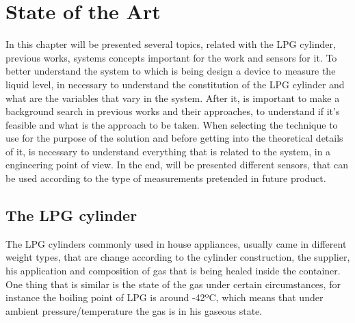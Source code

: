 \cleardoublepage
\chapter{State of the Art}\label{chap:stArt}


In this chapter will be presented several topics, related with the LPG cylinder, previous works, systems concepts important for the work and sensors for it. To better understand the system to which is being design a device to measure the liquid level, in necessary to understand the constitution of the LPG cylinder and what are the variables that vary in the system. After it, is important to make a background search in previous works and their approaches, to understand if it's feasible and what is the approach to be taken. When selecting the technique to use for the purpose of the solution and before getting into the theoretical details of it, is necessary to understand everything that is related to the system, in a engineering point of view. In the end, will be presented different sensors, that can be used according to the type of measurements pretended in future product.     
\section{The LPG cylinder}
The LPG cylinders commonly used in house appliances, usually came in different weight types, that are change according to the cylinder construction, the supplier, his application and composition of gas that is being healed inside the container. One thing that is similar is the state of the gas under certain circumstances, for instance the boiling point of LPG is around -42ºC, which means that under ambient pressure/temperature the gas is in his gaseous state. 

